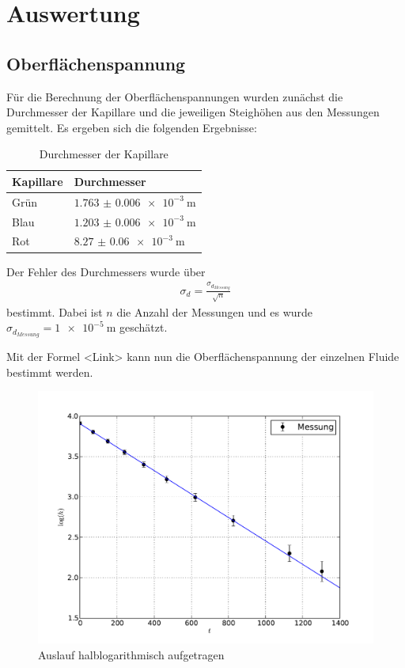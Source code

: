 \section{Auswertung}
\subsection{Oberflächenspannung}
Für die Berechnung der Oberflächenspannungen wurden zunächst die Durchmesser der Kapillare und die jeweiligen Steighöhen aus den Messungen gemittelt. Es ergeben sich die folgenden Ergebnisse:
\begin{table}[!htbp]
\centering
	\begin{tabular}{l|l}
		\hline
		Kapillare & Durchmesser \\
		\hline \hline
		Grün  & $\SI{1.763(6)e-3}{\m}$  \\
		Blau & $\SI{1.203(6)e-3}{\m}$  \\
		Rot & $\SI{8.27(6)e-3}{\m}$ \\
		\hline
	\end{tabular}
	\caption{Durchmesser der Kapillare}
	\label{tab:1}
\end{table}
\newline
Der Fehler des Durchmessers wurde über
\begin{align*}
\sigma_d = \frac{\sigma_{d_{Messung}}}{\sqrt{n}}
\end{align*}
bestimmt. Dabei ist $n$ die Anzahl der Messungen und es wurde $\sigma_{d_{Messung}} = \SI{1e-5}{\m}$ geschätzt.

Mit der Formel <Link> kann nun die Oberflächenspannung der einzelnen Fluide bestimmt werden. 

\begin{figure}[!htbp]
\begin{center}
	\includegraphics[scale=0.70]{Plot_Aufg2b}
\end{center}
\caption{Auslauf halblogarithmisch aufgetragen}
\end{figure}
